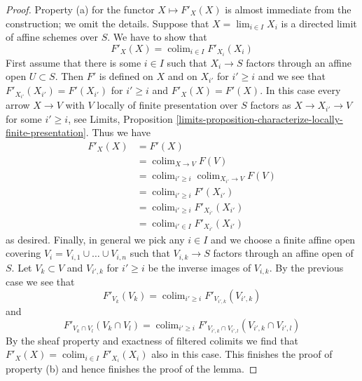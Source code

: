 \documentclass{stacks-project}
\theoremstyle{plain}
\theoremstyle{definition}
\theoremstyle{remark}
\numberwithin{equation}{subsection}
\def\lim{\mathop{\mathrm{lim}}\nolimits}
\def\colim{\mathop{\mathrm{colim}}\nolimits}
\begin{document}
\begin{proof}
\medskip\noindent
Property (a) for the functor $X \mapsto F'_X(X)$ is almost immediate
from the construction; we omit the details.
Suppose that $X = \lim_{i \in I} X_i$
is a directed limit of affine schemes over $S$. We have to show that
$$
F'_X(X) = \colim_{i \in I} F'_{X_i}(X_i)
$$
First assume that there is some $i \in I$ such that
$X_i \to S$ factors through an affine open $U \subset S$.
Then $F'$ is defined on $X$ and on $X_{i'}$ for $i' \geq i$
and we see that $F'_{X_{i'}}(X_{i'}) = F'(X_{i'})$ for
$i' \geq i$ and $F'_X(X) = F'(X)$. In this case every arrow
$X \to V$ with $V$ locally of finite presentation
over $S$ factors as $X \to X_{i'} \to V$ for some
$i' \geq i$, see Limits, Proposition
\ref{limits-proposition-characterize-locally-finite-presentation}.
Thus we have
\begin{align*}
F'_X(X)
& =
F'(X)  \\
& = \colim_{X \to V} F(V) \\
& =
\colim_{i' \geq i} \colim_{X_{i'} \to V} F(V) \\
& =
\colim_{i' \geq i} F'(X_{i'}) \\
& =
\colim_{i' \geq i} F'_{X_{i'}}(X_{i'}) \\
& =
\colim_{i' \in I} F'_{X_{i'}}(X_{i'})
\end{align*}
as desired. Finally, in general we pick any $i \in I$ and we choose
a finite affine open covering $V_i = V_{i, 1} \cup \ldots \cup V_{i, n}$
such that $V_{i, k} \to S$ factors through an affine open of $S$.
Let $V_k \subset V$ and $V_{i', k}$ for $i' \geq i$
be the inverse images of $V_{i, k}$.
By the previous case we see that
$$
F'_{V_k}(V_k) = \colim_{i' \geq i} F'_{V_{i', k}}(V_{i', k})
$$
and
$$
F'_{V_k \cap V_l}(V_k \cap V_l) =
\colim_{i' \geq i}
F'_{V_{i', k} \cap V_{i', l}}(V_{i', k} \cap V_{i', l})
$$
By the sheaf property and exactness of filtered colimits
we find that $F'_X(X) = \colim_{i \in I} F'_{X_i}(X_i)$
also in this case. This finishes the proof of property (b)
and hence finishes the proof of the lemma.
\end{proof}
\end{document}
